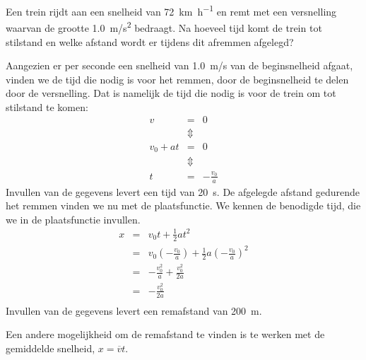\documentclass{ximera}
\begin{document}
\begin{exercise}
    Een trein rijdt aan een snelheid van \SI{72}{\kilo\meter\per\hour} en remt met een versnelling waarvan de grootte \SI{1,0}{m/s^2} bedraagt. Na hoeveel tijd komt de trein tot stilstand en welke afstand wordt er tijdens dit afremmen afgelegd?

    \begin{oplossing}
        Aangezien er per seconde een snelheid van \SI{1,0}{m/s} van de beginsnelheid afgaat, vinden we de tijd die nodig is voor het remmen, door de beginsnelheid te delen door de versnelling. Dat is namelijk de tijd die nodig is voor de trein om tot stilstand te komen:
        \begin{eqnarray*}
            v&=&0\\
            &\Updownarrow&\\
            v_0+at&=&0\\
            &\Updownarrow&\\
            t&=&-\frac{v_0}{a}
        \end{eqnarray*}
        Invullen van de gegevens levert een tijd van \SI{20}{s}. De afgelegde afstand gedurende het remmen vinden we nu met de plaatsfunctie. We kennen de benodigde tijd, die we in de plaatsfunctie invullen.
        \begin{eqnarray*}
            x&=&v_0t+\frac{1}{2}at^2\\
            &=&v_0\left(-\frac{v_0}{a}\right)+\frac{1}{2}a\left(-\frac{v_0}{a}\right)^2\\
            &=&-\frac{v_0^2}{a}+\frac{v_0^2}{2a}\\
            &=&-\frac{v_0^2}{2a}\\
        \end{eqnarray*}
        Invullen van de gegevens levert een remafstand van \SI{200}{m}. 

        Een andere mogelijkheid om de remafstand te vinden is te werken met de gemiddelde snelheid, $x=\overline{v}t$.
    \end{oplossing}
\end{exercise}
\end{document}
